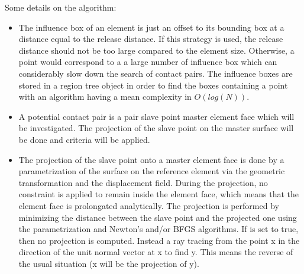 \documentclass[a4paper,11pt,english]{sphinxmanual}
\begin{document}
\begin{figure}[htbp]
\centering

\noindent{}
\end{figure}

\begin{figure}[htbp]
\centering

\noindent{}
\end{figure}

Some details on the algorithm:
\begin{itemize}
\item {} 
 The influence box of an element is just
an offset to its bounding box at a distance equal to the release distance.
If this strategy is used, the release distance should not be too large
compared to the element size. Otherwise, a point would correspond to a
a large number of influence box which can considerably slow down the search
of contact pairs. The influence boxes are stored in a region tree object
in order to find the boxes containing a point with an algorithm having
a mean complexity in \(O(log(N))\).

\item {} 
 A potential contact pair is a pair
slave point \sphinxhyphen{} master element face which will be investigated.
The projection of the slave point on the master surface will be done
and criteria will be applied.

\item {} 
 The projection of the slave point onto a
master element face is done by a parametrization of the surface on the
reference element via the geometric transformation and the displacement
field. During the projection, no constraint is applied to remain inside
the element face, which means that the element face is prolongated
analytically. The projection is performed by minimizing the distance
between the slave point and the projected one using the parametrization
and Newton’s and/or BFGS algorithms. If  is set to true, then
no projection is computed. Instead a ray tracing from the point x in
the direction of the unit normal vector at x to find y. This means
the reverse of the usual situation (x will be the projection of y).

\end{itemize}
\end{document}
